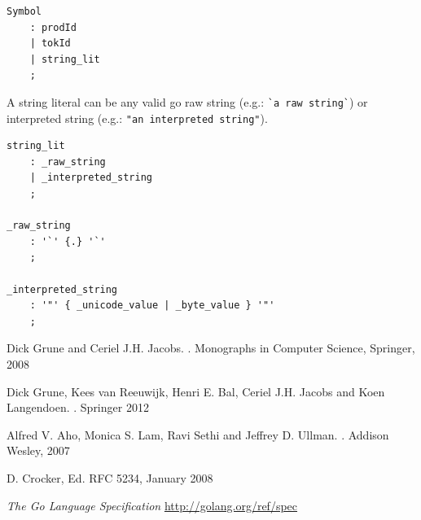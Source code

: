 \documentclass[12pt]{article}
\begin{document}
\begin{Verbatim}[frame=single]
Symbol
    : prodId
    | tokId
    | string_lit
    ;
\end{Verbatim}

A string literal can be any valid go raw string (e.g.: \verb|`a raw string`|) or interpreted string (e.g.: \verb|"an interpreted string"|).

\begin{Verbatim}[frame=single]
string_lit
    : _raw_string
    | _interpreted_string
    ;

_raw_string
    : '`' {.} '`'
    ;

_interpreted_string
    : '"' { _unicode_value | _byte_value } '"'
    ;
\end{Verbatim}




\nocite{Parsing, Modern Compiler Design, Dragon Book, ABNF}
\begin{thebibliography}{99}
	Dick Grune and Ceriel J.H. Jacobs.
	.
	\newblock Monographs in Computer Science, Springer, 2008

	Dick Grune, Kees van Reeuwijk, Henri E. Bal, Ceriel J.H. Jacobs and Koen Langendoen.
	.
	\newblock Springer 2012

	Alfred V. Aho, Monica S. Lam, Ravi Sethi and Jeffrey D. Ullman.
	.
	\newblock Addison Wesley, 2007

	D. Crocker, Ed.
	\newblock RFC 5234, January 2008

	{\em The Go Language Specification}
	\newblock \url{http://golang.org/ref/spec}


\end{thebibliography}
\end{document}
